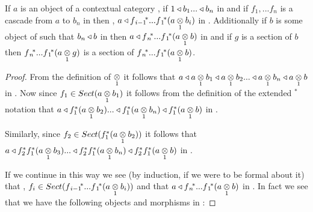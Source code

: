 \begin{lemma}
If $a$ is an object of a contextual category \catc, if $1 \base b_1 ... \base b_n$ in \catcw and if $f_1,...f_n$ is a cascade from $a$ to $b_n$ in  \catcw then \foreachi, $a \base \fipvectorstar(\crossx{a}{b_i}{1})$ in \catc.
Additionally if $b$ is some object of \catcw such that $b_n \base b$ in \catcw then 
 $a \base \fnvectorstar(\crossx{a}{b}{1})$ in \catcw and
if $g$ is a section of $b$ then $\fnvectorstar(\crossx{a}{g}{1})$ is a section of $\fnvectorstar(\crossx{a}{b}{1})$.
\end{lemma}
\begin{proof}
From the definition of $\crossx{}{}{1}$ it follows that $a \base \crossx{a}{b_1}{1} \base \crossx{a}{b_2}{1} ... \base \crossx{a}{b_n}{1} \base \crossx{a}{b}{1}$ in \catc. Now since $f_1 \in Sect(\crossx{a}{b_1}{1})$ it follows from the definition of the extended $^*$ notation
that $a \base f_1^*(\crossx{a}{b_2}{1})  ... \base f_1^*(\crossx{a}{b_n}{1}) \base f_1^*(\crossx{a}{b}{1})$ in \catc.

Similarly, since $f_2 \in Sect(f_1^*(\crossx{a}{b_2}{1}))$ it follows 
that $a \base f_2^*f_1^*(\crossx{a}{b_3}{1})  ... \base f_2^*f_1^*(\crossx{a}{b_n}{1}) \base f_2^*f_1^*(\crossx{a}{b}{1})$ in \catc.

If we continue in this way we see (by induction,  if we were to be formal about it) that \foreachi, $f_i \in Sect(\fipvectorstar(\crossx{a}{b_i}{1}))$
and that $a \base \fnvectorstar(\crossx{a}{b}{1})$ in \catc. In fact we see that
we have the following objects and morphisms in \catc:


\end{proof}
